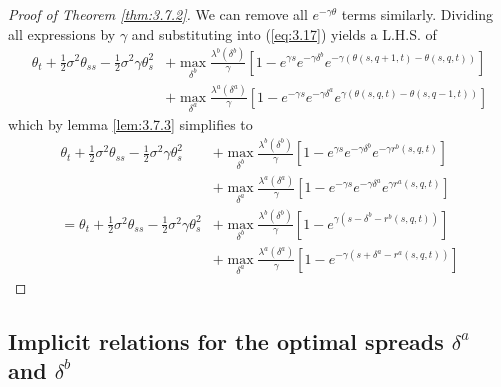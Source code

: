 \begin{proof}[Proof of Theorem \ref{thm:3.7.2}]
    We can remove all $e^{-\gamma \theta}$ terms similarly. Dividing 
    all expressions by $\gamma$ and substituting into (\ref{eq:3.17})
    yields a L.H.S. of
    \begin{align*}
        \theta_t+\frac{1}{2}\sigma^2\theta_{ss}-\frac{1}{2}\sigma^2\gamma\theta_s^2&+\max\limits_{\delta^b}\frac{\lambda^b(\delta^b)}{\gamma}[1-e^{\gamma s}e^{-\gamma \delta^b}e^{-\gamma(\theta(s,q+1,t)-\theta(s,q,t))}]\\
        &+\max\limits_{\delta^a}\frac{\lambda^a(\delta^a)}{\gamma}[1-e^{-\gamma s}e^{-\gamma\delta^a}e^{\gamma(\theta(s,q,t)-\theta(s,q-1,t))}]
    \end{align*}
    which by lemma \ref{lem:3.7.3} simplifies to
    \begin{align*}
        \theta_t+\frac{1}{2}\sigma^2\theta_{ss}-\frac{1}{2}\sigma^2\gamma\theta_s^2&+\max\limits_{\delta^b}\frac{\lambda^b(\delta^b)}{\gamma}[1-e^{\gamma s}e^{-\gamma \delta^b}e^{-\gamma r^b(s,q,t)}]\\
        &+\max\limits_{\delta^a}\frac{\lambda^a(\delta^a)}{\gamma}[1-e^{-\gamma s}e^{-\gamma\delta^a}e^{\gamma r^a(s,q,t)}]\\
        =\theta_t+\frac{1}{2}\sigma^2\theta_{ss}-\frac{1}{2}\sigma^2\gamma\theta_s^2&+\max\limits_{\delta^b}\frac{\lambda^b(\delta^b)}{\gamma}[1-e^{\gamma (s-\delta^b-r^b(s,q,t))}]\\
        &+\max\limits_{\delta^a}\frac{\lambda^a(\delta^a)}{\gamma}[1-e^{-\gamma (s+\delta^a-r^a(s,q,t))}]
    \end{align*}
\end{proof}

\subsection*{Implicit relations for the optimal spreads $\delta^a$ and $\delta^b$}

